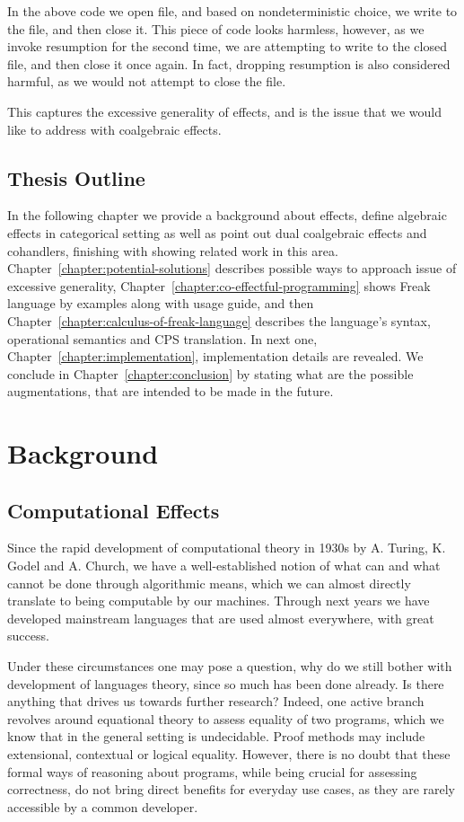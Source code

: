 \documentclass[declaration,shortabstract]{iithesis}
\theoremstyle{definition} \newtheorem{definition}{Definition}[chapter]
\theoremstyle{remark} \newtheorem{remark}[definition]{Observation}
\theoremstyle{plain} \newtheorem{theorem}[definition]{Theorem}
\theoremstyle{plain} \newtheorem{lemma}[definition]{Lemma}
\begin{document}
In the above code we open file, and based on nondeterministic choice, we write
to the file, and then close it. This piece of code looks harmless, however, as
we invoke resumption for the second time, we are attempting to write to the
closed file, and then close it once again. In fact, dropping resumption is also
considered harmful, as we would not attempt to close the file.

This captures the excessive generality of effects, and is the issue that we
would like to address with coalgebraic effects.

\section{Thesis Outline}

In the following chapter we provide a background
about effects, define algebraic effects in categorical setting as well as point
out dual coalgebraic effects and cohandlers, finishing with showing related work
in this area. Chapter~\ref{chapter:potential-solutions} describes possible ways
to approach issue of excessive generality,
Chapter~\ref{chapter:co-effectful-programming} shows Freak language by
examples along with usage guide, and then
Chapter~\ref{chapter:calculus-of-freak-language} describes the language's syntax,
operational semantics and CPS translation. In next one,
Chapter~\ref{chapter:implementation}, implementation details are revealed.
We conclude in Chapter~\ref{chapter:conclusion} by stating what are the possible
augmentations, that are intended to be made in the future.

\chapter{Background}\label{chapter:background}

\section{Computational Effects}

Since the rapid development of computational theory in 1930s by A. Turing,
K. Godel and A. Church, we have a well-established notion of what can and what
cannot be done through algorithmic means, which we can almost directly translate
to being computable by our machines. Through next years we have developed
mainstream languages that are used almost everywhere, with great success.

Under these circumstances one may pose a question, why do we still bother with
development of languages theory, since so much has been done already. Is there
anything that drives us towards further research? Indeed, one active branch
revolves around equational theory to assess equality of two programs, which we
know that in the general setting is undecidable. Proof methods may include
extensional, contextual or logical equality. However, there is no doubt that
these formal ways of reasoning about programs, while being crucial for assessing
correctness, do not bring direct benefits for everyday use cases, as they are
rarely accessible by a common developer.
\end{document}
